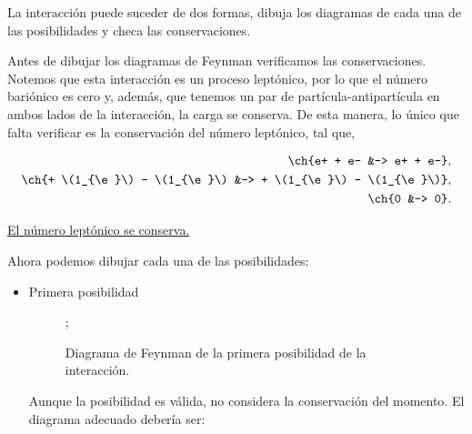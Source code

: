 \documentclass[./../main.tex]{subfiles}
\begin{document}
    \begin{exercise}
        La interacción  puede suceder de dos formas, dibuja los diagramas de cada una de las posibilidades y checa las conservaciones.

        \begin{solution}
            Antes de dibujar los diagramas de Feynman verificamos las conservaciones. Notemos que esta interacción es un proceso leptónico, por lo que el número bariónico es cero y, además, que tenemos un par de partícula-antipartícula en ambos lados de la interacción, \idest la carga se conserva. De esta manera, lo único que falta verificar es la conservación del número leptónico, tal que,

            \begin{align*}
                \ch{e+ + e- &-> e+ + e-},\\
                \ch{+ \(1_{\e}\) - \(1_{\e}\) &-> + \(1_{\e}\) - \(1_{\e}\)},\\
                \ch{0 &-> 0}.
            \end{align*}

            \ul{El número leptónico se conserva.}

            Ahora podemos dibujar cada una de las posibilidades:

            \begin{itemize}
                \item Primera posibilidad

                \begin{figure}[htb]
                    \centering
                    ;
                    \caption{Diagrama de Feynman de la primera posibilidad de la interacción.}
                    \label{fig:first-possibility-incomplete}
                \end{figure}                

                \pagebreak
                Aunque la posibilidad es válida, no considera la conservación del momento. El diagrama adecuado debería ser:


\end{itemize}
\end{solution}
\end{exercise}
\end{document}
